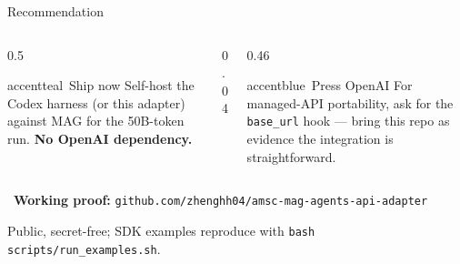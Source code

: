 \begin{frame}{Recommendation}
  \begin{columns}[t, totalwidth=\textwidth]
    \begin{column}{0.5\textwidth}
      \begin{featbox}{accentteal}{\faRocket\ Ship now}
        \small Self-host the Codex harness (or this adapter) against MAG for the
        50B-token run. \textbf{No OpenAI dependency.}
      \end{featbox}
    \end{column}
    \begin{column}{0.04\textwidth}\end{column}
    \begin{column}{0.46\textwidth}
      \begin{featbox}{accentblue}{\faHandshake\ Press OpenAI}
        \small For managed-API portability, ask for the \texttt{base\_url} hook
        --- bring this repo as evidence the integration is straightforward.
      \end{featbox}
    \end{column}
  \end{columns}
  \vspace{14pt}
  \begin{center}
    \faGithub\ \textbf{Working proof:}\quad
    {\small\texttt{github.com/zhenghh04/amsc-mag-agents-api-adapter}}
  \end{center}
  \vspace{4pt}
  \begin{center}
    {\footnotesize\color{midgray}Public, secret-free; SDK examples reproduce with
    \texttt{bash scripts/run\_examples.sh}.}
  \end{center}
\end{frame}

